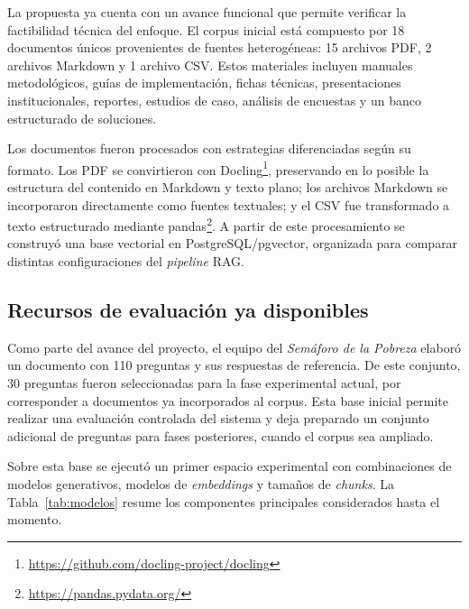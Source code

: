 \documentclass{article}
\begin{document}
La propuesta ya cuenta con un avance funcional que permite verificar la factibilidad técnica del enfoque. El corpus inicial está compuesto por 18 documentos únicos provenientes de fuentes heterogéneas: 15 archivos PDF, 2 archivos Markdown y 1 archivo CSV. Estos materiales incluyen manuales metodológicos, guías de implementación, fichas técnicas, presentaciones institucionales, reportes, estudios de caso, análisis de encuestas y un banco estructurado de soluciones.

Los documentos fueron procesados con estrategias diferenciadas según su formato. Los PDF se convirtieron con Docling\footnote{\url{https://github.com/docling-project/docling}}, preservando en lo posible la estructura del contenido en Markdown y texto plano; los archivos Markdown se incorporaron directamente como fuentes textuales; y el CSV fue transformado a texto estructurado mediante pandas\footnote{\url{https://pandas.pydata.org/}}. A partir de este procesamiento se construyó una base vectorial en PostgreSQL/pgvector, organizada para comparar distintas configuraciones del \textit{pipeline} RAG.

\subsection{Recursos de evaluación ya disponibles}

Como parte del avance del proyecto, el equipo del \textit{Semáforo de la Pobreza} elaboró un documento con 110 preguntas y sus respuestas de referencia. De este conjunto, 30 preguntas fueron seleccionadas para la fase experimental actual, por corresponder a documentos ya incorporados al corpus. Esta base inicial permite realizar una evaluación controlada del sistema y deja preparado un conjunto adicional de preguntas para fases posteriores, cuando el corpus sea ampliado.

Sobre esta base se ejecutó un primer espacio experimental con combinaciones de modelos generativos, modelos de \textit{embeddings} y tamaños de \textit{chunks}. La Tabla~\ref{tab:modelos} resume los componentes principales considerados hasta el momento.
\end{document}
